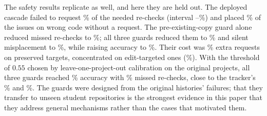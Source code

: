 The safety results replicate as well, and here they are held out. The deployed cascade failed to request \hTwoDepMiss\% of the needed re-checks (interval \hTwoDepMissLo--\hTwoDepMissHi\%) and placed \hTwoDepSilent\% of the issues on wrong code without a request. The pre-existing-copy guard alone reduced missed re-checks to \hTwoAGMiss\%; all three guards reduced them to \hTwoAllMiss\% and silent misplacement to \hTwoAllSilent\%, while raising accuracy to \hTwoAllAcc\%. Their cost was \hTwoAllFalse\% extra requests on preserved targets, concentrated on edit-targeted ones (\hTwoAllTgtFalse\%). With the threshold of $0.55$ chosen by leave-one-project-out calibration on the original projects, all three guards reached \hTwoAllCalAcc\% accuracy with \hTwoAllCalMiss\% missed re-checks, close to the tracker's \hTwoTrkAcc\% and \hTwoTrkMiss\%. The guards were designed from the original histories' failures; that they transfer to unseen student repositories is the strongest evidence in this paper that they address general mechanisms rather than the cases that motivated them.

